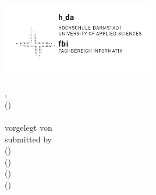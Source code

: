 \begin{titlingpage}
	\vspace*{0cm}
	\sffamily 
	\begin{centering}
		\includegraphics[width=0.5\textwidth]{images/fbi_logo.pdf} \\
		\vspace{2.5cm}
		\Huge
			\textbf{\docType} \\
		\vspace{1cm}
		\normalsize
			\docCourse, \docCourseSemester \\
		\small
			(\textit{\docCourseProf}) \\
		\vspace{3cm}
		\LARGE
			\docTypeRubric \\
		\vspace{5cm}
		\normalsize
			\ifde
				vorgelegt von\\
			\else
				submitted by\\
			\fi
		\vspace{1cm}	
		\large
			\docStudentA \hspace{0.1cm} (\docStudentAMatrikel)\\
			\vspace{0.2cm}
			\docStudentB \hspace{0.1cm} (\docStudentBMatrikel)\\
			\vspace{0.2cm}
			\docStudentC \hspace{0.1cm} (\docStudentCMatrikel)\\
			\vspace{0.2cm}
			\docStudentD \hspace{0.1cm} (\docStudentDMatrikel)\\
			\vspace{1cm}
		\normalsize
			\docDate \\
	\end{centering}
	
\end{titlingpage}

